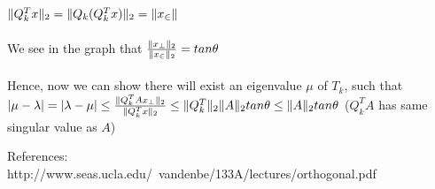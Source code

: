 \documentclass[11pt]{article}
\begin{document}
\begin{solution}
\begin{enumerate}
            $\mathopen\| Q_k^Tx \mathclose\|_2 = \mathopen\| Q_k(Q_k^Tx) \mathclose\|_2 = \mathopen\| x_\in \mathclose\|$\\
            \\
            We see in the graph that $\frac{\mathopen\| x_{\perp} \mathclose\|_2}{\mathopen\| x_\in \mathclose\|_2} = tan\theta$\\
            \\
            Hence, now we can show there will exist an eigenvalue $\mu$ of $T_k$, such that \\
            $|\mu - \lambda| = |\lambda - \mu|\leq \frac{\mathopen\| Q_k^TAx_{\perp} \mathclose\|_2}{\mathopen\| Q_k^Tx \mathclose\|_2} \leq \mathopen\| Q_k^T \mathclose\|_2 \mathopen\| A \mathclose\|_2 tan\theta \leq \mathopen\| A \mathclose\|_2 tan\theta$ ($Q_k^TA$ has same singular value as $A$)
            
            
            
        \end{enumerate}
    
\end{solution}
References: \\ 
http://www.seas.ucla.edu/~vandenbe/133A/lectures/orthogonal.pdf\\
\end{document}

